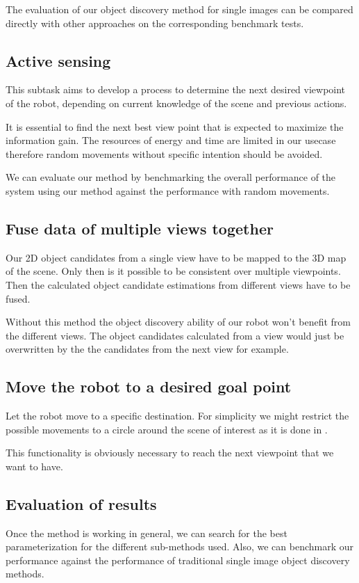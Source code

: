 \documentclass[a4paper,11pt,english]{article}
\begin{document}
The evaluation of our object discovery method for single images can be compared directly with other approaches on the corresponding benchmark tests.

\subsection{Active sensing}
This subtask aims to develop a process to determine the next desired viewpoint of the robot, depending on current knowledge of the scene and previous actions.

It is essential to find the next best view point that is expected to maximize the information gain.
The resources of energy and time are limited in our usecase therefore random movements without specific intention should be avoided.

We can evaluate our method by benchmarking the overall performance of the system using our method against the performance with random movements.

\subsection{Fuse data of multiple views together}
Our 2D object candidates from a single view have to be mapped to the 3D map of the scene.
Only then is it possible to be consistent over multiple viewpoints.
Then the calculated object candidate estimations from different views have to be fused.

Without this method the object discovery ability of our robot won't benefit from the different views.
The object candidates calculated from a view would just be overwritten by the the candidates from the next view for example.

\subsection{Move the robot to a desired goal point}
Let the robot move to a specific destination.
For simplicity we might restrict the possible movements to a circle around the scene of interest as it is done in \cite{atanasov2014nonmyopic}.

This functionality is obviously necessary to reach the next viewpoint that we want to have.

\subsection{Evaluation of results}
Once the method is working in general, we can search for the best parameterization for the different sub-methods used.
Also, we can benchmark our performance against the performance of traditional single image object discovery methods.
\end{document}
